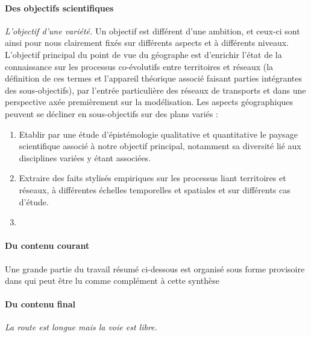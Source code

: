 \paragraph{Des objectifs scientifiques}


\emph{L'objectif d'une variété.} Un objectif est différent d'une ambition, et ceux-ci sont ainsi pour nous clairement fixés sur différents aspects et à différents niveaux. L'objectif principal du point de vue du géographe est d'enrichir l'état de la connaissance sur les processus co-évolutifs entre territoires et réseaux (la définition de ces termes et l'appareil théorique associé faisant parties intégrantes des sous-objectifs), par l'entrée particulière des réseaux de transports et dans une perspective axée premièrement sur la modélisation. Les aspects géographiques peuvent se décliner en sous-objectifs sur des plans variés :
\begin{enumerate}
\item Etablir par une étude d'épistémologie qualitative et quantitative le paysage scientifique associé à notre objectif principal, notamment sa diversité lié aux disciplines variées y étant associées.
\item Extraire des faits stylisés empiriques sur les processus liant territoires et réseaux, à différentes échelles temporelles et spatiales et sur différents cas d'étude.
\item 
\end{enumerate}
 



\paragraph{Du contenu courant}

Une grande partie du travail résumé ci-dessous est organisé sous forme provisoire dans \cite{raimbault2016memoire} qui peut être lu comme complément à cette synthèse


\paragraph{Du contenu final}

\emph{La route est longue mais la voie est libre.}













